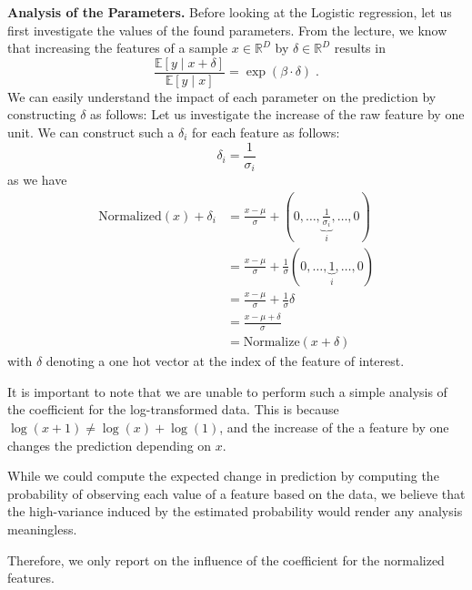 \textbf{Analysis of the Parameters.}
Before looking at the Logistic regression, let us first investigate the values of the found parameters.
From the lecture, we know that increasing the features of a sample $x\in \mathbb{R}^D$ by $\delta\in\mathbb{R}^D$ results in
\begin{equation}
    \frac{\mathbb{E}[y\mid x+\delta]}{\mathbb{E}[y\mid x]} = \exp(\beta \cdot \delta)\;. 
    \label{eq:increase_parameter}
\end{equation}
We can easily understand the impact of each parameter on the prediction by constructing $\delta$ as follows: Let us investigate the increase of the raw feature by one unit. We can construct such a $\delta_i$ for each feature as follows:
\begin{equation*}
    \delta_i = \frac{1}{\sigma_i}
\end{equation*}
as we have 
{
\allowdisplaybreaks
\begin{align*}
    \mathrm{Normalized}(x) + \delta_i &= \frac{x-\mu}{\sigma} + (0, \dots, \underbrace{\frac{1}{\sigma_i}}_i, \dots, 0) \\
    &= \frac{x-\mu}{\sigma} + \frac{1}{\sigma}(0, \dots, \underbrace{1}_i, \dots, 0) \\
    &= \frac{x-\mu}{\sigma} + \frac{1}{\sigma}\delta \\
    &= \frac{x -\mu + \delta}{\sigma} \\
    &= \mathrm{Normalize}(x+\delta)
\end{align*}
}
with $\delta$ denoting a one hot vector at the index of the feature of interest.

It is important to note that we are unable to perform such a simple analysis of the coefficient for the log-transformed data. This is because $\log(x+1) \neq \log(x)+\log(1)$, and the increase of the a feature by one changes the prediction depending on $x$. 

While we could compute the expected change in prediction by computing the probability of observing each value of a feature based on the data, we believe that the high-variance induced by the estimated probability would render any analysis meaningless.

Therefore, we only report on the influence of the coefficient for the normalized features. 


